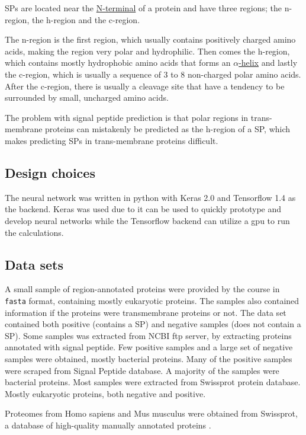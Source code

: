 SPs are located near the \href{https://en.wikipedia.org/wiki/N-terminus}{N-terminal} of a protein and have three regions; the n-region, the h-region and the c-region.

The n-region is the first region, which usually contains positively charged amino acids, making the region very polar and hydrophilic. Then comes the h-region, which contains mostly hydrophobic amino acids that forms an \href{https://en.wikipedia.org/wiki/Alpha_helix}{$\alpha$-helix} and lastly the c-region, which is usually a sequence of 3 to 8 non-charged polar amino acids. After the c-region, there is usually a cleavage site that have a tendency to be surrounded by small, uncharged amino acids.

The problem with signal peptide prediction is that polar regions in trans-membrane proteins can mistakenly be predicted as the h-region of a SP, which makes predicting SPs in trans-membrane proteins difficult.

\subsection{Design choices}
The neural network was written in python with Keras 2.0 and Tensorflow 1.4 as the backend. Keras was used due to it can be used to quickly prototype and develop neural networks while the Tensorflow backend can utilize a gpu to run the calculations.

\subsection{Data sets}

A small sample of region-annotated proteins were provided by the course in \verb|fasta| format, containing mostly eukaryotic proteins. The samples also contained information if the proteins were transmembrane proteins or not. The data set contained both positive (contains a SP) and negative samples (does not contain a SP).
Some samples was extracted from NCBI ftp server, by extracting proteins annotated with signal peptide. Few positive samples and a large set of negative samples were obtained, mostly bacterial proteins.
Many of the positive samples were scraped from Signal Peptide database. A majority of the samples were bacterial proteins.
Most samples were extracted from Swissprot protein database. Mostly eukaryotic proteins, both negative and positive.

Proteomes from Homo sapiens and Mus musculus were obtained from Swissprot, a database of high-quality manually annotated proteins \cite{swissprot}.


